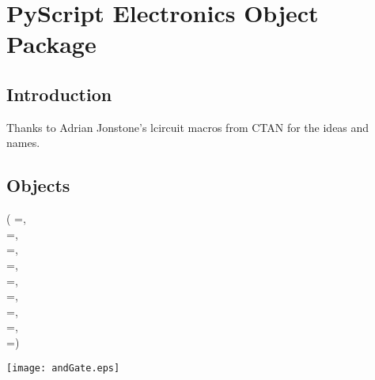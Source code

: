 \chapter{PyScript Electronics Object Package}

\section{Introduction}

Thanks to Adrian Jonstone's lcircuit macros from CTAN for the ideas
and names.

\section{Objects}

\label{func:pyscriptElectronicsAnd}
\begin{funcDesc}
\item[] (%
	=,\\
	=,\\
	=,\\
	=,\\
	=,\\
	=,\\
	=,\\
	=,\\
	=)

\begin{funcExCode}

\end{funcExCode}

\begin{funcExOut}
\texttt{[image: andGate.eps]}
\end{funcExOut}

\end{funcDesc}

